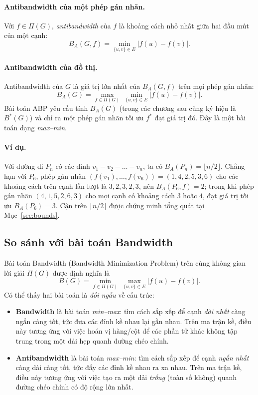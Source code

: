 \documentclass[a4paper,fleqn]{cas-sc}
\begin{document}
\paragraph{Antibandwidth của một phép gán nhãn.} Với $f \in \Pi(G)$, \emph{antibandwidth} của $f$ là khoảng cách nhỏ nhất giữa hai đầu mút của một cạnh:
\begin{equation}
B_A(G, f) = \min_{\{u,v\} \in E} |f(u) - f(v)|.
\end{equation}

\paragraph{Antibandwidth của đồ thị.} Antibandwidth của $G$ là giá trị lớn nhất của $B_A(G, f)$ trên mọi phép gán nhãn:
\begin{equation}
\label{eq:abp}
B_A(G) = \max_{f \in \Pi(G)} \; \min_{\{u,v\} \in E} |f(u) - f(v)|.
\end{equation}
Bài toán ABP yêu cầu tính $B_A(G)$ (trong các chương sau cũng ký hiệu là $B^*(G)$) và chỉ ra một phép gán nhãn tối ưu $f^\ast$ đạt giá trị đó. Đây là một bài toán dạng \emph{max--min}.

\paragraph{Ví dụ.} Với đường đi $P_n$ có các đỉnh $v_1 - v_2 - \dots - v_n$, ta có $B_A(P_n) = \lfloor n/2 \rfloor$. Chẳng hạn với $P_6$, phép gán nhãn $(f(v_1), \dots, f(v_6)) = (1, 4, 2, 5, 3, 6)$ cho các khoảng cách trên cạnh lần lượt là $3, 2, 3, 2, 3$, nên $B_A(P_6, f) = 2$; trong khi phép gán nhãn $(4, 1, 5, 2, 6, 3)$ cho mọi cạnh có khoảng cách $3$ hoặc $4$, đạt giá trị tối ưu $B_A(P_6) = 3$. Cận trên $\lfloor n/2 \rfloor$ được chứng minh tổng quát tại Mục~\ref{sec:bounds}.

\subsection{So sánh với bài toán Bandwidth}
\label{sec:bandwidth}
Bài toán Bandwidth (Bandwidth Minimization Problem) trên cùng không gian lời giải $\Pi(G)$ được định nghĩa là
\begin{equation}
B(G) = \min_{f \in \Pi(G)} \; \max_{\{u,v\} \in E} |f(u) - f(v)|.
\end{equation}
Có thể thấy hai bài toán là \emph{đối ngẫu} về cấu trúc:
\begin{itemize}
  \item \textbf{Bandwidth} là bài toán \emph{min--max}: tìm cách sắp xếp để cạnh \emph{dài nhất} càng ngắn càng tốt, tức đưa các đỉnh kề nhau lại gần nhau. Trên ma trận kề, điều này tương ứng với việc hoán vị hàng/cột để các phần tử khác không tập trung trong một dải hẹp quanh đường chéo chính.
  \item \textbf{Antibandwidth} là bài toán \emph{max--min}: tìm cách sắp xếp để cạnh \emph{ngắn nhất} càng dài càng tốt, tức đẩy các đỉnh kề nhau ra xa nhau. Trên ma trận kề, điều này tương ứng với việc tạo ra một dải \emph{trống} (toàn số không) quanh đường chéo chính có độ rộng lớn nhất.
\end{itemize}
\end{document}
